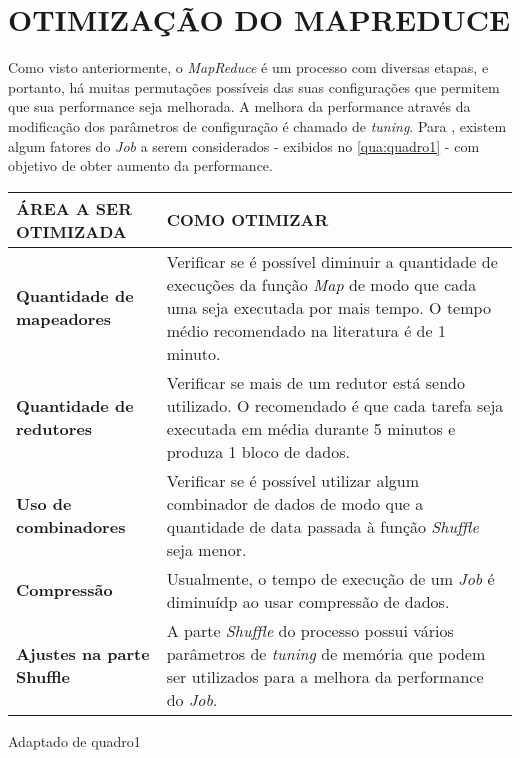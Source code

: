 \chapter{OTIMIZAÇÃO DO MAPREDUCE} \label{cha:otimizacaomapreduce}

Como visto anteriormente, o \textit{MapReduce} é um processo com diversas etapas, e portanto, há muitas permutações possíveis das suas configurações que permitem que sua performance seja melhorada. A melhora da performance através da modificação dos parâmetros de configuração é chamado de \textit{tuning}. Para \textcite{HadoopBook15}, existem algum fatores do \textit{Job} a serem considerados - exibidos no \autoref{qua:quadro1} - com objetivo de obter aumento da performance.

{\footnotesize
  \centering
  \begin{tabular}{|p{50mm}|p{100mm}|}\hline
    \textbf{ÁREA A SER OTIMIZADA}     & \textbf{COMO OTIMIZAR}                                                                                                                                                                       \\\hline
    \textbf{Quantidade de mapeadores} & Verificar se é possível diminuir a quantidade de execuções da função \textit{Map} de modo que cada uma seja executada por mais tempo. O tempo médio recomendado na literatura é de 1 minuto. \\\hline
    \textbf{Quantidade de redutores}  & Verificar se mais de um redutor está sendo utilizado. O recomendado é que cada tarefa seja executada em média durante 5 minutos e produza 1 bloco de dados.                                  \\\hline
    \textbf{Uso de combinadores}      & Verificar se é possível utilizar algum combinador de dados de modo que a quantidade de data passada à função \textit{Shuffle} seja menor.                                                    \\\hline
    \textbf{Compressão}               & Usualmente, o tempo de execução de um \textit{Job} é diminuídp ao usar compressão de dados.                                                                                                  \\\hline
    \textbf{Ajustes na parte Shuffle} & A parte \textit{Shuffle} do processo possui vários parâmetros de \textit{tuning} de memória que podem ser utilizados para a melhora da performance do \textit{Job}.                          \\\hline
  \end{tabular}}
{Adaptado de \cite{HadoopBook15}}{quadro1}{}{}



